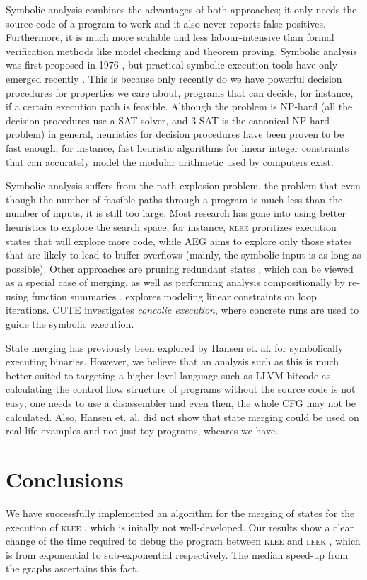 \documentclass[12pt,a4paper]{article}
\newcommand{\klee}{\textsc{klee }}
\newcommand{\leek}{\textsc{leek }}
\begin{document}
Symbolic analysis combines the advantages of both approaches; it only needs the source code of a program to work and it also never reports false positives. Furthermore, it is much more scalable and less labour-intensive than formal verification methods like model checking and theorem proving. Symbolic analysis was first proposed in 1976 \cite{old}, but practical symbolic execution tools have only emerged recently \cite{klee}\cite{dart}. This is because only recently do we have powerful decision procedures \cite{bitvecarray} for properties we care about, programs that can decide, for instance, if a certain execution path is feasible. Although the problem is NP-hard (all the decision procedures use a SAT solver, and 3-SAT is the canonical NP-hard problem) in general, heuristics for decision procedures have been proven to be fast enough; for instance, fast heuristic algorithms for linear integer constraints that can accurately model the modular arithmetic used by computers exist.

Symbolic analysis suffers from the path explosion problem, the problem that even though the number of feasible paths through a program is much less than the number of inputs, it is still too large. Most research has gone into using better heuristics to explore the search space; for instance, \klee proritizes execution states that will explore more code, while AEG \cite{aeg} aims to explore only those states that are likely to lead to buffer overflows (mainly, the symbolic input is as long as possible). Other approaches are pruning redundant states \cite{rwset}, which can be viewed as a special case of merging, as well as performing analysis compositionally by re-using function summaries \cite{cdtg}. \cite{loopsum} explores modeling linear constraints on loop iterations. CUTE \cite{cute} investigates \emph{concolic execution}, where concrete runs are used to guide the symbolic execution.

State merging has previously been explored by Hansen et. al. \cite{statejoin} for symbolically executing binaries. However, we believe that an analysis such as this is much better suited to targeting a higher-level language such as LLVM bitcode as calculating the control flow structure of programs without the source code is not easy; one needs to use a disassembler and even then, the whole CFG may not be calculated. Also, Hansen et. al. did not show that state merging could be used on real-life examples and not just toy programs, wheares we have.

\section{Conclusions}\label{conclusions}
We have successfully implemented an algorithm for the merging of states for the execution of \klee, which is initally not well-developed. Our results show a clear change of the time required to debug the program between \klee and \leek, which is from exponential to sub-exponential respectively. The median speed-up from the graphs ascertains this fact.
\end{document}
